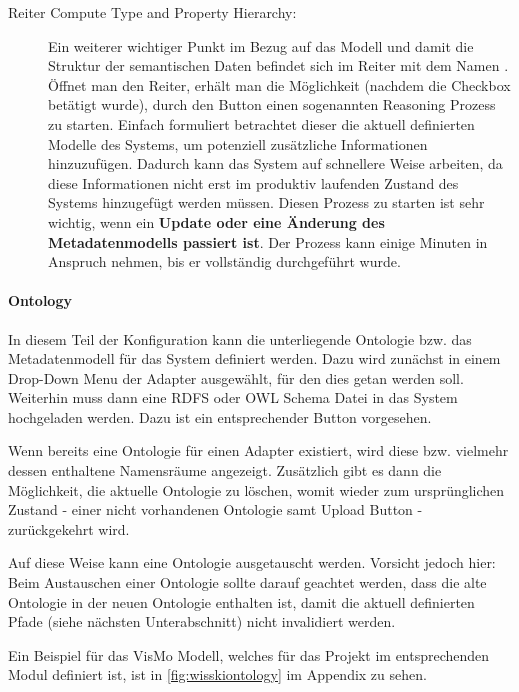 \begin{description}
	\item[Reiter Compute Type and Property Hierarchy:] Ein weiterer wichtiger Punkt im Bezug auf das Modell und damit die Struktur der semantischen Daten befindet sich im Reiter mit dem Namen . Öffnet man den Reiter, erhält man die Möglichkeit (nachdem die Checkbox  betätigt wurde), durch den Button  einen sogenannten Reasoning Prozess zu starten. Einfach formuliert  betrachtet dieser die aktuell definierten Modelle des Systems, um potenziell zusätzliche Informationen hinzuzufügen. Dadurch kann das System auf schnellere Weise arbeiten, da diese Informationen nicht erst im produktiv laufenden Zustand des Systems hinzugefügt werden müssen. Diesen Prozess zu starten ist sehr wichtig, wenn ein \textbf{Update oder eine Änderung des Metadatenmodells passiert ist}. Der Prozess kann einige Minuten in Anspruch nehmen, bis er vollständig durchgeführt wurde.
\end{description}

\paragraph{\wisski Ontology}

In diesem Teil der Konfiguration kann die unterliegende Ontologie bzw. das Metadatenmodell für das System definiert werden. Dazu wird zunächst in einem Drop-Down Menu der Adapter ausgewählt, für den dies getan werden soll. Weiterhin muss dann eine RDFS oder OWL Schema Datei in das \wisski System hochgeladen werden. Dazu ist ein entsprechender Button vorgesehen.

Wenn bereits eine Ontologie für einen Adapter existiert, wird diese bzw. vielmehr dessen enthaltene Namensräume angezeigt. Zusätzlich gibt es dann die Möglichkeit, die aktuelle Ontologie zu löschen, womit wieder zum ursprünglichen Zustand - einer nicht vorhandenen Ontologie samt Upload Button - zurückgekehrt wird.

Auf diese Weise kann eine Ontologie ausgetauscht werden. Vorsicht jedoch hier: Beim Austauschen einer Ontologie sollte darauf geachtet werden, dass die alte Ontologie in der neuen Ontologie enthalten ist, damit die aktuell definierten Pfade (siehe nächsten Unterabschnitt) nicht invalidiert werden.

Ein Beispiel für das VisMo Modell, welches für das \visit Projekt im entsprechenden \wisski Modul definiert ist, ist in \autoref{fig:wisskiontology} im Appendix zu sehen.

